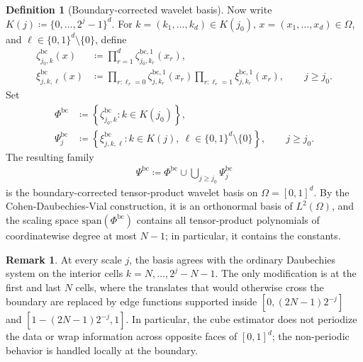 \documentclass[11pt,reqno]{amsart}
\theoremstyle{definition}
\newtheorem{definition}{Definition}
\newtheorem{remark}{Remark}
\begin{document}
\begin{definition}[Boundary-corrected wavelet basis]
Now write $K(j)\coloneqq \{0,\ldots,2^j-1\}^d$. For $k=(k_1,\ldots,k_d)\in K(j_0)$, $x=(x_1,\ldots,x_d)\in \Omega$, and $\ell\in\{0,1\}^d\setminus\{0\}$, define
\begin{align*}
    \zeta_{j_0,k}^{\mathrm{bc}}(x)
    &\coloneqq
    \prod_{r=1}^d \zeta_{j_0,k_r}^{\mathrm{bc},1}(x_r),\\
    \xi_{j,k,\ell}^{\mathrm{bc}}(x)
    &\coloneqq
    \prod_{r:\ell_r=0}\zeta_{j,k_r}^{\mathrm{bc},1}(x_r)
    \prod_{r:\ell_r=1}\xi_{j,k_r}^{\mathrm{bc},1}(x_r),
    \qquad j\ge j_0.
\end{align*}
Set
\begin{align*}
    \Phi^{\mathrm{bc}}
    &\coloneqq
    \left\{\zeta_{j_0,k}^{\mathrm{bc}}:k\in K(j_0)\right\},\\
    \Psi_j^{\mathrm{bc}}
    &\coloneqq
    \left\{\xi_{j,k,\ell}^{\mathrm{bc}}:k\in K(j),\ \ell\in\{0,1\}^d\setminus\{0\}\right\},
    \qquad j\ge j_0.
\end{align*}
The resulting family
\begin{align*}
    \Psi^{\mathrm{bc}}
    \coloneqq
    \Phi^{\mathrm{bc}}\cup\bigcup_{j\ge j_0}\Psi_j^{\mathrm{bc}}
\end{align*}
is the boundary-corrected tensor-product wavelet basis on $\Omega=[0,1]^d$. By the Cohen-Daubechies-Vial construction, it is an orthonormal basis of $L^2(\Omega)$, and the scaling space $\mathrm{span}(\Phi^{\mathrm{bc}})$ contains all tensor-product polynomials of coordinatewise degree at most $N-1$; in particular, it contains the constants.
\end{definition}

\begin{remark}
At every scale $j$, the basis agrees with the ordinary Daubechies system on the interior cells $k=N,\ldots,2^j-N-1$. The only modification is at the first and last $N$ cells, where the translates that would otherwise cross the boundary are replaced by edge functions supported inside $[0,(2N-1)2^{-j}]$ and $[1-(2N-1)2^{-j},1]$. In particular, the cube estimator does not periodize the data or wrap information across opposite faces of $[0,1]^d$; the non-periodic behavior is handled locally at the boundary.
\end{remark}
\end{document}
